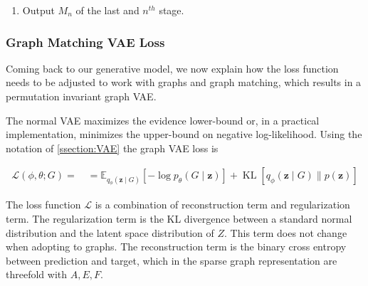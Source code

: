 \begin{enumerate}
\begin{enumerate}
\begin{align*}
            \alpha_{i} &\leftarrow\left\{\begin{array}{ll}
            \alpha_{i}+\theta & i \in I^{*} \\
            \alpha_{i}-\theta & i \notin I^{*}
            \end{array}\right \\
            \beta_{j} &\leftarrow\left\{\begin{array}{ll}
            \beta_{j}-\theta & j \in J^{*} \\
            \beta_{j}+\theta & j \notin J^{*}
            \end{array}\right \\
        \end{align*}
        \item Augment $M_{k-1}$ by flipping the unmatched with the matched edges on the selected augmentation path. Thus $M_k$ is given by $\left(M_{k-1}-P\right) \cup\left(P-M_{k-1}\right)$ and $P$ is the set of edges of the current augmentation path.
    \end{enumerate}
    \item Output $M_n$ of the last and $n^{th}$ stage.
\end{enumerate}



\subsubsection{Graph Matching VAE Loss}
\label{ssec3:GVAEloss}
Coming back to our generative model, we now explain how the loss function needs to be adjusted to work with graphs and graph matching, which results in a permutation invariant graph VAE.

The normal VAE maximizes the evidence lower-bound or, in a practical implementation, minimizes the upper-bound on negative log-likelihood. Using the notation of \ref{ssection:VAE} the graph VAE loss is

\begin{equation}
    \begin{array}{l}
    \mathcal{L}(\phi, \theta ; G)=\quad=\mathbb{E}_{q_{\phi}(\mathbf{z} \mid G)}\left[-\log p_{\theta}(G \mid \mathbf{z})\right]+\operatorname{KL}\left[q_{\phi}(\mathbf{z} \mid G) \| p(\mathbf{z})\right]
    \end{array}
\end{equation}

The loss function $\mathcal{L}$ is a combination of reconstruction term and regularization term. The regularization term is the KL divergence between a standard normal distribution and the latent space distribution of $Z$. This term does not change when adopting to graphs. The reconstruction term is the binary cross entropy between prediction and target, which in the sparse graph representation are threefold with $A, E, F$. 

